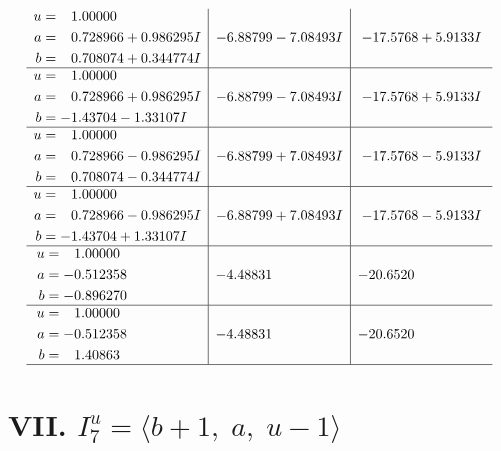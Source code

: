 \documentclass[1p]{elsarticle_modified}
\theoremstyle{definition}
\begin{document}
$$\begin{array}{c|c|c}
\begin{aligned}
u &= \phantom{-}1.00000\phantom{ +0.000000I} \\
a &= \phantom{-}0.728966 + 0.986295 I \\
b &= \phantom{-}0.708074 + 0.344774 I\end{aligned}
 & -6.88799 - 7.08493 I & -17.5768 + 5.9133 I \\ \hline\begin{aligned}
u &= \phantom{-}1.00000\phantom{ +0.000000I} \\
a &= \phantom{-}0.728966 + 0.986295 I \\
b &= -1.43704 - 1.33107 I\end{aligned}
 & -6.88799 - 7.08493 I & -17.5768 + 5.9133 I \\ \hline\begin{aligned}
u &= \phantom{-}1.00000\phantom{ +0.000000I} \\
a &= \phantom{-}0.728966 - 0.986295 I \\
b &= \phantom{-}0.708074 - 0.344774 I\end{aligned}
 & -6.88799 + 7.08493 I & -17.5768 - 5.9133 I \\ \hline\begin{aligned}
u &= \phantom{-}1.00000\phantom{ +0.000000I} \\
a &= \phantom{-}0.728966 - 0.986295 I \\
b &= -1.43704 + 1.33107 I\end{aligned}
 & -6.88799 + 7.08493 I & -17.5768 - 5.9133 I \\ \hline\begin{aligned}
u &= \phantom{-}1.00000\phantom{ +0.000000I} \\
a &= -0.512358\phantom{ +0.000000I} \\
b &= -0.896270\phantom{ +0.000000I}\end{aligned}
 & -4.48831\phantom{ +0.000000I} & -20.6520\phantom{ +0.000000I} \\ \hline\begin{aligned}
u &= \phantom{-}1.00000\phantom{ +0.000000I} \\
a &= -0.512358\phantom{ +0.000000I} \\
b &= \phantom{-}1.40863\phantom{ +0.000000I}\end{aligned}
 & -4.48831\phantom{ +0.000000I} & -20.6520\phantom{ +0.000000I}\\
 \hline 
 \end{array}$$\newpage\newpage\renewcommand{\arraystretch}{1}
\centering \section*{VII. $I^u_{7}= \langle b+1,\;a,\;u-1 \rangle$}
\end{document}
